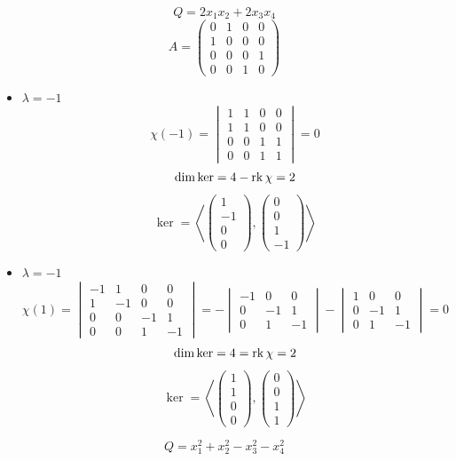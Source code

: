 $$ Q = 2x_1x_2 + 2x_3x_4 $$
$$ A =
\begin{pmatrix}
	0 & 1 & 0 & 0 \\
    1 & 0 & 0 & 0 \\
    0 & 0 & 0 & 1 \\
    0 & 0 & 1 & 0
\end{pmatrix} $$
\begin{itemize}
	\item $ \lambda = -1 $
    $$ \chi(-1) =
    \begin{vmatrix}
    	1 & 1 & 0 & 0 \\
        1 & 1 & 0 & 0 \\
        0 & 0 & 1 & 1 \\
        0 & 0 & 1 & 1
    \end{vmatrix} = 0 $$
    $$ \dim \ker = 4 - \operatorname{rk} \chi = 2 $$
    $$ \ker = \left\langle
    \begin{pmatrix}
    	1 \\
        -1 \\
        0 \\
        0
    \end{pmatrix},
    \begin{pmatrix}
    	0 \\
        0 \\
        1 \\
        -1
    \end{pmatrix} \right\rangle $$
    \item $ \lambda = -1 $
    $$ \chi(1) =
    \begin{vmatrix}
    	-1 & 1 & 0 & 0 \\
        1 & -1 & 0 & 0 \\
        0 & 0 & -1 & 1 \\
        0 & 0 & 1 & -1
    \end{vmatrix} = -
    \begin{vmatrix}
    	-1 & 0 & 0 \\
        0 & -1 & 1 \\
        0 & 1 & -1
    \end{vmatrix} -
    \begin{vmatrix}
    	1 & 0 & 0 \\
        0 & -1 & 1 \\
        0 & 1 & -1
    \end{vmatrix} = 0 $$
    $$ \dim \ker = 4 = \operatorname{rk} \chi = 2 $$
    $$ \ker = \left\langle
    \begin{pmatrix}
    	1 \\
        1 \\
        0 \\
        0
    \end{pmatrix},
    \begin{pmatrix}
        0 \\
        0 \\
        1 \\
        1
    \end{pmatrix} \right\rangle $$
\end{itemize}
$$ Q = x_1^2 + x_2^2 - x_3^2 - x_4^2 $$

